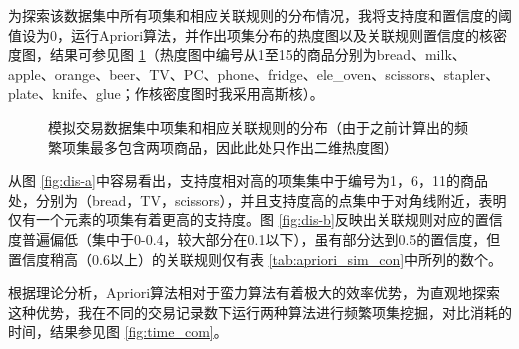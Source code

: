 \documentclass[12pt,a4paper]{article}
\theoremstyle{definition}
\begin{document}
为探索该数据集中所有项集和相应关联规则的分布情况，我将支持度和置信度的阈值设为0，运行Apriori算法，并作出项集分布的热度图以及关联规则置信度的核密度图，结果可参见图 \ref{fig:dis}（热度图中编号从1至15的商品分别为bread、milk、apple、orange、beer、TV、PC、phone、fridge、ele\_oven、scissors、stapler、plate、knife、glue；作核密度图时我采用高斯核）。

\vspace{-0.012\linewidth}
\begin{figure}[H]
	\centering
	\caption{模拟交易数据集中项集和相应关联规则的分布（由于之前计算出的频繁项集最多包含两项商品，因此此处只作出二维热度图）}
	\label{fig:dis}
\end{figure}

从图 \ref{fig:dis-a}中容易看出，支持度相对高的项集集中于编号为1，6，11的商品处，分别为（bread，TV，scissors），并且支持度高的点集中于对角线附近，表明仅有一个元素的项集有着更高的支持度。图 \ref{fig:dis-b}反映出关联规则对应的置信度普遍偏低（集中于0-0.4，较大部分在0.1以下），虽有部分达到0.5的置信度，但置信度稍高（0.6以上）的关联规则仅有表 \ref{tab:apriori_sim_con}中所列的数个。

\vspace{0.01\linewidth}
根据理论分析，Apriori算法相对于蛮力算法有着极大的效率优势，为直观地探索这种优势，我在不同的交易记录数下运行两种算法进行频繁项集挖掘，对比消耗的时间，结果参见图 \ref{fig:time_com}。
\end{document}
